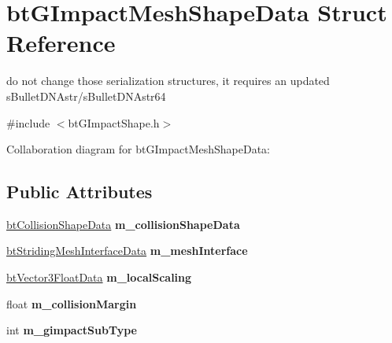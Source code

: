 \hypertarget{structbt_g_impact_mesh_shape_data}{\section{bt\+G\+Impact\+Mesh\+Shape\+Data Struct Reference}
\label{structbt_g_impact_mesh_shape_data}
}


do not change those serialization structures, it requires an updated s\+Bullet\+D\+N\+Astr/s\+Bullet\+D\+N\+Astr64  




{\ttfamily \#include $<$bt\+G\+Impact\+Shape.\+h$>$}



Collaboration diagram for bt\+G\+Impact\+Mesh\+Shape\+Data\+:
\subsection*{Public Attributes}
\begin{DoxyCompactItemize}
\item 
\hypertarget{structbt_g_impact_mesh_shape_data_a07bd784d15bf2f004ae03ec7fbe33c5a}{\hyperlink{structbt_collision_shape_data}{bt\+Collision\+Shape\+Data} {\bfseries m\+\_\+collision\+Shape\+Data}}\label{structbt_g_impact_mesh_shape_data_a07bd784d15bf2f004ae03ec7fbe33c5a}

\item 
\hypertarget{structbt_g_impact_mesh_shape_data_a635a1bc2cfb2a9c4c73799c4be50df54}{\hyperlink{structbt_striding_mesh_interface_data}{bt\+Striding\+Mesh\+Interface\+Data} {\bfseries m\+\_\+mesh\+Interface}}\label{structbt_g_impact_mesh_shape_data_a635a1bc2cfb2a9c4c73799c4be50df54}

\item 
\hypertarget{structbt_g_impact_mesh_shape_data_ae8e15246acba144c3383e86b903894ff}{\hyperlink{structbt_vector3_float_data}{bt\+Vector3\+Float\+Data} {\bfseries m\+\_\+local\+Scaling}}\label{structbt_g_impact_mesh_shape_data_ae8e15246acba144c3383e86b903894ff}

\item 
\hypertarget{structbt_g_impact_mesh_shape_data_aded76ad490cff87f5f8b51e726b9d221}{float {\bfseries m\+\_\+collision\+Margin}}\label{structbt_g_impact_mesh_shape_data_aded76ad490cff87f5f8b51e726b9d221}

\item 
\hypertarget{structbt_g_impact_mesh_shape_data_a405b8aa1e0b9a7d46cf9bc1540214820}{int {\bfseries m\+\_\+gimpact\+Sub\+Type}}\label{structbt_g_impact_mesh_shape_data_a405b8aa1e0b9a7d46cf9bc1540214820}

\end{DoxyCompactItemize}


